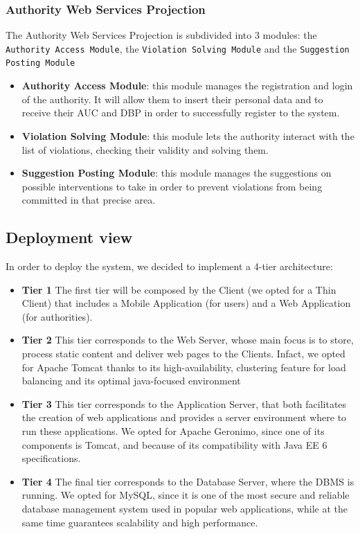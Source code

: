 \documentclass[12pt,a4paper]{article}
\begin{document}
\subsubsection{Authority Web Services Projection}
The Authority Web Services Projection is subdivided into 3 modules: the \texttt{Authority Access Module}, the \texttt{Violation Solving Module} and the \texttt{Suggestion Posting Module}
\begin{itemize}
\item \textbf{Authority Access Module}: this module manages the registration and login of the authority. It will allow them to insert their personal data and to receive their AUC and DBP in order to successfully register to the system.
\item \textbf{Violation Solving Module}: this module lets the authority interact with the list of violations, checking their validity and solving them. 
\item \textbf{Suggestion Posting Module}: this module manages the suggestions on possible interventions to take in order to prevent violations from being committed in that precise area.
\end{itemize}


\subsection{Deployment view}
In order to deploy the system, we decided to implement a 4-tier architecture:
\begin{itemize}
\item \textbf{Tier 1}
The first tier will be composed by the Client (we opted for a Thin Client) that includes a Mobile Application (for users) and a Web Application (for authorities).
\item \textbf{Tier 2}
This tier corresponds to the Web Server, whose main focus is to store, process static content and deliver web pages to the Clients. Infact, we opted for Apache Tomcat thanks to its high-availability, clustering feature for load balancing and its optimal java-focused environment
\item \textbf{Tier 3}
This tier corresponds to the Application Server, that both facilitates the creation of web applications and provides a server environment where to run these applications. We opted for Apache Geronimo, since one of its components is Tomcat, and because of its compatibility with Java EE 6 specifications.
\item \textbf{Tier 4}
The final tier corresponds to the Database Server, where the DBMS is running. We opted for MySQL, since it is one of the most secure and reliable database management system used in popular web applications, while at the same time guarantees scalability and high performance.
\end{itemize}
\end{document}
